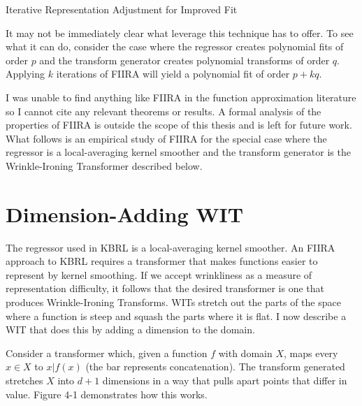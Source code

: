 \begin{algorithm}
\caption{Iterative Representation Adjustment for Improved Fit}\label{FIIRA}
\end{algorithm}

It may not be immediately clear what leverage this technique has to offer.
To see what it can do, consider the case where the regressor
creates polynomial fits of order $p$ and the transform generator
creates polynomial transforms of order $q$.
Applying $k$ iterations of FIIRA will yield a polynomial fit of order
$p + kq$.

I was unable to find anything like FIIRA in the function approximation
literature so I cannot cite any relevant theorems or results.
A formal analysis of the properties of FIIRA
is outside the scope of this thesis and is left for future work.
What follows is an empirical study of FIIRA for the special
case where the regressor is a local-averaging kernel smoother
and the transform generator is the Wrinkle-Ironing Transformer
described below.

\section{Dimension-Adding WIT}
The regressor used in KBRL is a local-averaging kernel smoother.
An FIIRA approach to KBRL requires a transformer that makes functions
easier to represent by kernel smoothing.
If we accept wrinkliness as a measure of representation difficulty,
it follows that the desired transformer is one that produces
Wrinkle-Ironing Transforms.
WITs stretch out the parts of the space where a function is steep
and squash the parts where it is flat.
I now describe a WIT that does this by adding a dimension to the domain.

Consider a transformer which, given a function $f$ with domain $X$, 
maps every $x \in X$ to $x | f(x)$ (the bar represents concatenation).
The transform generated stretches $X$ into $d+1$ dimensions in a way that
pulls apart points that differ in value.
Figure 4-1 demonstrates how this works.

